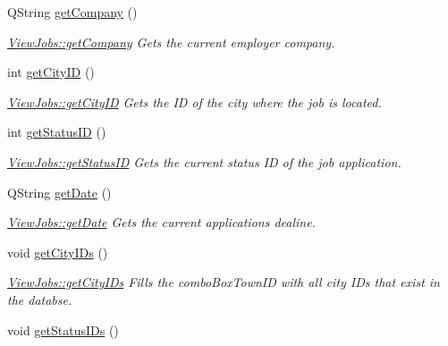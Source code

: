 \begin{DoxyCompactItemize}
Q\+String \hyperlink{class_view_jobs_a88d7c0a7a79bc7a7e02b524587983bf8}{get\+Company} ()
\begin{DoxyCompactList}\small\item\em \hyperlink{class_view_jobs_a88d7c0a7a79bc7a7e02b524587983bf8}{View\+Jobs\+::get\+Company} Gets the current employer company. \end{DoxyCompactList}\item 
int \hyperlink{class_view_jobs_adcafeca350b21a033aa630e042ee7947}{get\+City\+ID} ()
\begin{DoxyCompactList}\small\item\em \hyperlink{class_view_jobs_adcafeca350b21a033aa630e042ee7947}{View\+Jobs\+::get\+City\+ID} Gets the ID of the city where the job is located. \end{DoxyCompactList}\item 
int \hyperlink{class_view_jobs_a91696fde9f0a663bae929390aac8324b}{get\+Status\+ID} ()
\begin{DoxyCompactList}\small\item\em \hyperlink{class_view_jobs_a91696fde9f0a663bae929390aac8324b}{View\+Jobs\+::get\+Status\+ID} Gets the current status ID of the job application. \end{DoxyCompactList}\item 
Q\+String \hyperlink{class_view_jobs_af046f9201cc6031e070b4f9b613a35f9}{get\+Date} ()
\begin{DoxyCompactList}\small\item\em \hyperlink{class_view_jobs_af046f9201cc6031e070b4f9b613a35f9}{View\+Jobs\+::get\+Date} Gets the current application\textquotesingle{}s dealine. \end{DoxyCompactList}\item 
\mbox{\label{class_view_jobs_a6cf031afcc4a09dfca54044fdf8c4f7b}} 
void \hyperlink{class_view_jobs_a6cf031afcc4a09dfca54044fdf8c4f7b}{get\+City\+I\+Ds} ()
\begin{DoxyCompactList}\small\item\em \hyperlink{class_view_jobs_a6cf031afcc4a09dfca54044fdf8c4f7b}{View\+Jobs\+::get\+City\+I\+Ds} Fills the combo\+Box\+Town\+ID with all city I\+Ds that exist in the databse. \end{DoxyCompactList}\item 
\mbox{\label{class_view_jobs_adabe196e81c74d17c436de1a6ea12099}} 
void \hyperlink{class_view_jobs_adabe196e81c74d17c436de1a6ea12099}{get\+Status\+I\+Ds} ()

\end{DoxyCompactItemize}
